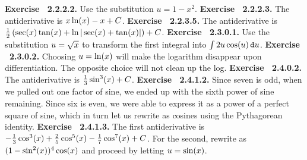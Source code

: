  {\noindent \protect \bf  Exercise ~2.2.2.2.} Use the substitution $u=1-x^2$. \protect \newline  \protect \newline  
 {\noindent \protect \bf  Exercise ~2.2.2.3.} The antiderivative is $x\protect \qopname  \relax o{ln}(x)-x+C$. \protect \newline  \protect \newline  
 {\noindent \protect \bf  Exercise ~2.2.3.5.} The antiderivative is $\protect \frac  {1}{2}\left (\protect \qopname  \relax o{sec}(x)\protect \qopname  \relax o{tan}(x)+\protect \qopname  \relax o{ln}|\protect \qopname  \relax o{sec}(x)+\protect \qopname  \relax o{tan}(x)|\right )+C$. \protect \newline  \protect \newline  
 {\noindent \protect \bf  Exercise ~2.3.0.1.} Use the substitution $u=\protect \sqrt  {x}$ to transform the first integral into $\intop 2u\protect \qopname  \relax o{cos}(u) \mathop {}\protect \tmspace  -\thinmuskip {.1667em}\protect \mathtt  {d}u$. \protect \newline  \protect \newline  
 {\noindent \protect \bf  Exercise ~2.3.0.2.} Choosing $u=\protect \qopname  \relax o{ln}(x)$ will make the logarithm disappear upon differentiation. The opposite choice will not clean up the log. \protect \newline  \protect \newline  
 {\noindent \protect \bf  Exercise ~2.4.0.2.} The antiderivative is $\protect \frac  {1}{3}\protect \qopname  \relax o{sin}^3(x)+C$. \protect \newline  \protect \newline  
 {\noindent \protect \bf  Exercise ~2.4.1.2.} Since seven is odd, when we pulled out one factor of sine, we ended up with the sixth power of sine remaining. Since six is even, we were able to express it as a power of a perfect square of sine, which in turn let us rewrite as cosines using the Pythagorean identity. \protect \newline  \protect \newline  
 {\noindent \protect \bf  Exercise ~2.4.1.3.} The first antiderivative is $-\protect \frac  {1}{3}\protect \qopname  \relax o{cos}^3(x)+\protect \frac  {2}{5}\protect \qopname  \relax o{cos}^5(x)-\protect \frac  {1}{7}\protect \qopname  \relax o{cos}^7(x)+C$. For the second, rewrite as $(1-\protect \qopname  \relax o{sin}^2(x))^4\protect \qopname  \relax o{cos}(x)$ and proceed by letting $u=\protect \qopname  \relax o{sin}(x)$. \protect \newline  \protect \newline  
